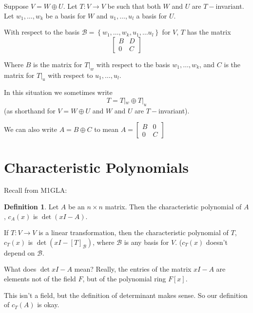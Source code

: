 \documentclass{article}
\theoremstyle{definition} \newtheorem*{definition}{Definition}
\newcommand{\B}{\mathcal{B}}
\begin{document}
 \begin{remark}
   Suppose $V = W \oplus U$. Let $T:V\rightarrow V$ be such that both
   $W$ and $U$ are $T-$invariant. Let $w_1,\dots, w_k$ be a basis for
   $W$ and $u_1, \dots , u_l$ a basis for $U$. 

   With respect to the basis $\mathcal{B} = \left\{ w_1, \dots , w_k, u_1,
   \dots u_l \right\}$ for $V$, $T$ has the matrix 
   \[
      \begin{bmatrix}
        B & D \\
        0 & C
      \end{bmatrix}
   \]

   Where $B$ is the matrix for $T|_w$ with respect to the basis
   $w_1, \dots, w_k$, and $C$ is the matrix for $T|_u$ with 
   respect to $u_1, \dots, u_l$.

   In this situation we sometimes write
   \[
     T = T|_w \oplus T|_u
   \]
   (as shorthand for $V  = W \oplus U$ and $W$ and $U$ are $T-$invariant).

   We can also write $A = B \oplus C$ to mean $A = 
      \begin{bmatrix}
        B & 0 \\
        0 & C
      \end{bmatrix}
   $
 \end{remark}
 \section{Characteristic Polynomials}
 Recall from M1GLA:\\
\begin{definition}
  Let $A$ be an $n\times n$ matrix. Then the characteristic polynomial of 
  $A$, $c_A(x)$ is $\det(xI - A)$.

  If $T:V \rightarrow V$ is a linear transformation, then the 
  characteristic polynomial of $T$, $c_T(x)$ is 
  $\det(xI - [T]_\B)$, where $\mathcal{B}$ is any basis for $V$.
  ($c_T(x)$ doesn't depend on $\mathcal{B}$.
\end{definition}

What does $\det{xI - A}$ mean? Really, the entries of the matrix $xI - A$
are elements not of the field $F$, but of the polynomial ring $F[x]$.

This isn't a field, but the definition of determinant makes sense. So
our definition of $c_T(A)$ is okay.
\end{document}
